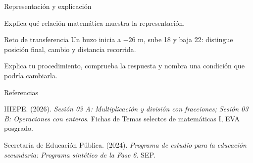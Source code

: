 \documentclass[
	spanish,
	aspectratio=1610,
	xcolor={dvipsnames,table}
]{beamer}
\begin{document}
\begin{frame}{Representación y explicación}
\centering{}\par\vspace{.15cm}\small Explica qué relación matemática muestra la representación.
\end{frame}
\begin{frame}{Reto de transferencia}
\fontsize{14}{18}\selectfont Un buzo inicia a $-26$ m, sube 18 y baja 22: distingue posición final, cambio y distancia recorrida.\par\vspace{.5cm}Explica tu procedimiento, comprueba la respuesta y nombra una condición que podría cambiarla.
\end{frame}
\begin{frame}{Referencias}
\fontsize{9}{11}\selectfont\raggedright 
{\setlength{\parskip}{6pt}
\par\hangindent=1.27cm  IIIEPE. (2026). \textit{Sesión 03 A: Multiplicación y división con fracciones; Sesión 03 B: Operaciones con enteros}. Fichas de Temas selectos de matemáticas I, EVA posgrado.
\par\hangindent=1.27cm  Secretaría de Educación Pública. (2024). \textit{Programa de estudio para la educación secundaria: Programa sintético de la Fase 6}. SEP.
}


\end{frame}
\end{document}
